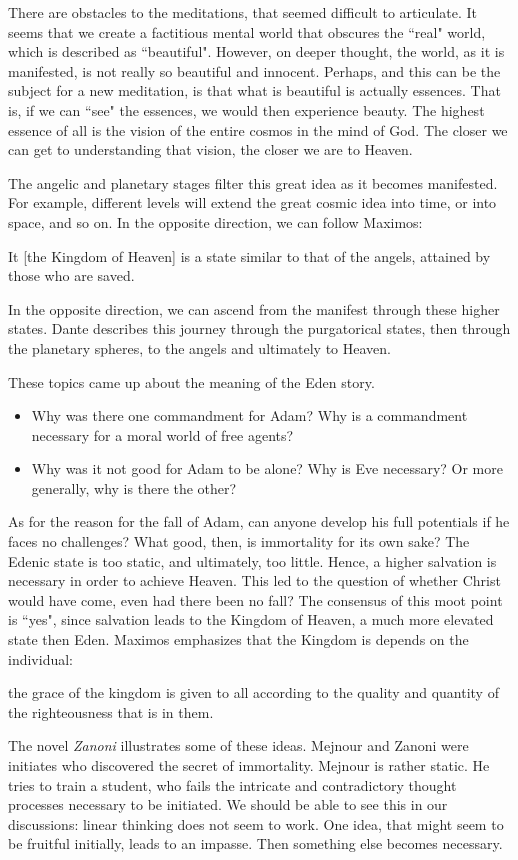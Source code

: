 There are obstacles to the meditations, that seemed difficult to articulate. It seems that we create a factitious mental world that obscures the ``real" world, which is described as ``beautiful". However, on deeper thought, the world, as it is manifested, is not really so beautiful and innocent. Perhaps, and this can be the subject for a new meditation, is that what is beautiful is actually essences. That is, if we can ``see" the essences, we would then experience beauty. The highest essence of all is the vision of the entire cosmos in the mind of God. The closer we can get to understanding that vision, the closer we are to Heaven.

The angelic and planetary stages filter this great idea as it becomes manifested. For example, different levels will extend the great cosmic idea into time, or into space, and so on. In the opposite direction, we can follow Maximos:

\begin{quotex}
It [the Kingdom of Heaven] is a state similar to that of the angels, attained by those who are saved.

\end{quotex}
In the opposite direction, we can ascend from the manifest through these higher states. Dante describes this journey through the purgatorical states, then through the planetary spheres, to the angels and ultimately to Heaven.

These topics came up about the meaning of the Eden story.

\begin{itemize}
\item Why was there one commandment for Adam? Why is a commandment necessary for a moral world of free agents? 
\item Why was it not good for Adam to be alone? Why is Eve necessary? Or more generally, why is there the other? 
\end{itemize}
As for the reason for the fall of Adam, can anyone develop his full potentials if he faces no challenges? What good, then, is immortality for its own sake? The Edenic state is too static, and ultimately, too little. Hence, a higher salvation is necessary in order to achieve Heaven. This led to the question of whether Christ would have come, even had there been no fall? The consensus of this moot point is ``yes", since salvation leads to the Kingdom of Heaven, a much more elevated state then Eden. Maximos emphasizes that the Kingdom is depends on the individual:

\begin{quotex}
the grace of the kingdom is given to all according to the quality and quantity of the righteousness that is in them.

\end{quotex}
The novel \emph{Zanoni} illustrates some of these ideas. Mejnour and Zanoni were initiates who discovered the secret of immortality. Mejnour is rather static. He tries to train a student, who fails the intricate and contradictory thought processes necessary to be initiated. We should be able to see this in our discussions: linear thinking does not seem to work. One idea, that might seem to be fruitful initially, leads to an impasse. Then something else becomes necessary.

